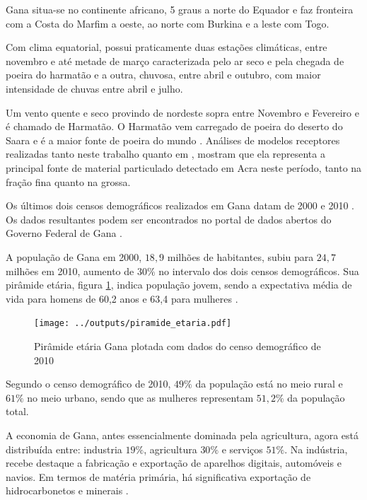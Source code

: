 Gana situa-se no continente africano, 5 graus a norte do Equador e 
faz fronteira com a Costa do Marfim a oeste, ao norte com Burkina
e a leste com Togo. 

Com clima equatorial, possui praticamente duas estações climáticas, 
entre novembro e até metade de março caracterizada pelo ar seco e pela 
chegada de poeira do harmatão e a outra, chuvosa, entre abril e outubro, 
com maior intensidade de chuvas entre abril e julho. 

Um vento quente e seco provindo de nordeste sopra entre Novembro e Fevereiro 
e é chamado de Harmatão. O Harmatão vem carregado de poeira do 
deserto do Saara e é a maior fonte de poeira do mundo \citep{breuning2005}. 
Análises de modelos receptores realizadas tanto neste trabalho quanto em 
\cite{zhou2011}, mostram que ela representa a principal fonte de material 
particulado detectado em Acra neste período, tanto na fração fina quanto na grossa.

Os últimos dois censos demográficos realizados em Gana datam
de 2000 \citep{ghanacensus2003} e 2010 \citep{ghanacensus2013}. Os
dados resultantes podem ser encontrados no portal de dados abertos
do Governo Federal de Gana \citep{opendataghana}.

A população de Gana em 2000, $18,9$ milhões de habitantes, subiu para $24,7$ 
milhões em 2010, aumento de $30\%$ no intervalo dos dois censos demográficos. 
Sua pirâmide etária, figura \ref{fig:piramedegana}, indica população 
jovem, sendo a expectativa média de vida para homens de 60,2 anos e 
63,4 para mulheres \citep{ghanacensus2013}.

\begin{figure}[H]
  \centering
  \texttt{[image: ../outputs/piramide\_etaria.pdf]}
  \caption{Pirâmide etária Gana plotada com dados do censo 
           demográfico de 2010 \citep{ghanacensus2013} \label{fig:piramedegana}}
\end{figure}

Segundo o censo demográfico de 2010, $49\%$ da população está no meio rural e 
$61\%$ no meio urbano, sendo que as mulheres representam $51,2\%$ da população
total.

A economia de Gana, antes essencialmente dominada pela agricultura, 
agora está distribuída entre: industria $19\%$, agricultura $30\%$ 
e serviços $51\%$. Na indústria, recebe destaque a fabricação e 
exportação de aparelhos digitais, automóveis e navios. 
Em termos de matéria primária, há significativa exportação de 
hidrocarbonetos e minerais \citep{ghanacensus2013}.
 
